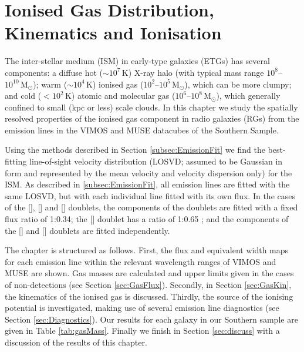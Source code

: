 \chapter{Ionised Gas Distribution, Kinematics and Ionisation}
	\label{cha:gas}
The inter-stellar medium (ISM) in early-type galaxies (ETGs) has several components: a diffuse hot ($\sim 10^7 \, \mathrm{K}$) X-ray halo (with typical mass range $10^8$--$10^{10} \, \mathrm{M_\odot}$); warm ($\sim 10^4 \, \mathrm{K}$) ionised gas ($10^2$--$10^5 \, \mathrm{M_\odot}$), which can be more clumpy; and cold ($<10^2 \, \mathrm{K}$) atomic and molecular gas ($10^6$--$10^8 \, \mathrm{M_\odot}$), which generally confined to small (kpc or less) scale clouds. In this chapter we study the spatially resolved properties of the ionised gas component in radio galaxies (RGs) from the emission lines in the VIMOS and MUSE datacubes of the Southern Sample.

Using the methods described in Section \ref{subsec:EmissionFit} we find the best-fitting line-of-sight velocity distribution (LOSVD; assumed to be Gaussian in form and represented by the mean velocity and velocity dispersion only) for the ISM. As described in \ref{subsec:EmissionFit}, all emission lines are fitted with the same LOSVD, but with each individual line fitted with its own flux. In the cases of the [], [] and [] doublets, the components of the doublets are fitted with a fixed flux ratio of 1:0.34; the [] doublet has a ratio of 1:0.65 \citep{Safier1992}; and the components of the [] and [] doublets are fitted independently.

The chapter is structured as follows. First, the flux and equivalent width maps for each emission line within the relevant wavelength ranges of VIMOS and MUSE are shown. Gas masses are calculated and upper limits given in the cases of non-detections (see Section \ref{sec:GasFlux}). Secondly, in Section \ref{sec:GasKin}, the kinematics of the ionised gas is discussed. Thirdly, the source of the ionising potential is investigated, making use of several emission line diagnostics (see Section \ref{sec:Diagnostics}). Our results for each galaxy in our Southern sample are given in Table \ref{tab:gasMass}. Finally we finish in Section \ref{sec:discuss} with a discussion of the results of this chapter.


